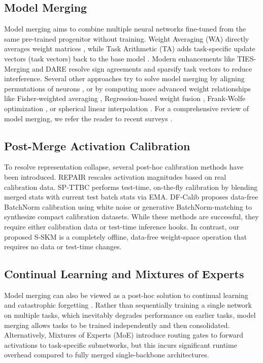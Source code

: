 \documentclass{article}
\begin{document}
\subsection{Model Merging}
Model merging aims to combine multiple neural networks fine-tuned from the same pre-trained progenitor without training. Weight Averaging (WA) directly averages weight matrices \cite{wortsman2022model,izmailov2018averaging,gupta2020stochastic,cha2021swad}, while Task Arithmetic (TA) adds task-specific update vectors (task vectors) back to the base model \cite{ilharco2022editing,mueller2021linear,dettmers2022gpt3}. Modern enhancements like TIES-Merging \cite{yadav2023ties} and DARE \cite{yu2024dare} resolve sign agreements and sparsify task vectors to reduce interference. Several other approaches try to solve model merging by aligning permutations of neurons \cite{ainsworth2023git,stoica2024zipit,crisostomi2024c2m3}, or by computing more advanced weight relationships like Fisher-weighted averaging \cite{matena2022merging}, Regression-based weight fusion \cite{jin2023dataless}, Frank-Wolfe optimization \cite{chen2025fwmerging}, or spherical linear interpolation \cite{shoemake1985animating}. For a comprehensive review of model merging, we refer the reader to recent surveys \cite{yang2026ModelMergingSurvey,liu2023deep}.

\subsection{Post-Merge Activation Calibration}
To resolve representation collapse, several post-hoc calibration methods have been introduced. REPAIR \cite{jordan2023repair} rescales activation magnitudes based on real calibration data. SP-TTBC \cite{pragmatist2026ttbc} performs test-time, on-the-fly calibration by blending merged stats with current test batch stats via EMA. DF-Calib \cite{anonymous2026dfcalib} proposes data-free BatchNorm calibration using white noise or generative BatchNorm-matching to synthesize compact calibration datasets. While these methods are successful, they require either calibration data or test-time inference hooks. In contrast, our proposed S-SKM is a completely offline, data-free weight-space operation that requires no data or test-time changes.

\subsection{Continual Learning and Mixtures of Experts}
Model merging can also be viewed as a post-hoc solution to continual learning and catastrophic forgetting \cite{kirkpatrick2017overcoming,zenke2017continual,aljundi2018memory,mallya2018piggyback,lesort2021continual}. Rather than sequentially training a single network on multiple tasks, which inevitably degrades performance on earlier tasks, model merging allows tasks to be trained independently and then consolidated. Alternatively, Mixtures of Experts (MoE) \cite{shazeer2017outrageously,ramesh2021gated} introduce routing gates to forward activations to task-specific subnetworks, but this incurs significant runtime overhead compared to fully merged single-backbone architectures.
\end{document}
